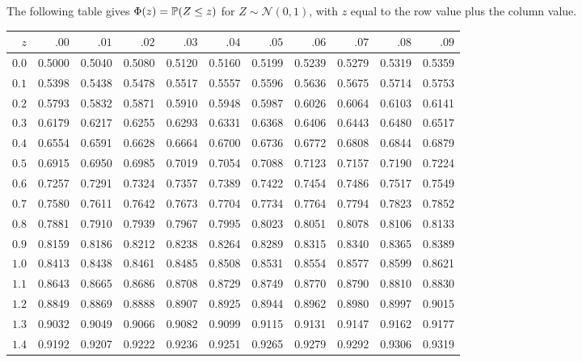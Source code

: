 \documentclass[11pt,oneside]{article}
\begin{document}
\noindent The following table gives $\Phi(z)=\mathbb{P}(Z\le z)$ for $Z\sim\mathcal N(0,1)$, with $z$ equal to the row value plus the column value.
\begin{center}
\begingroup\scriptsize
\setlength{\tabcolsep}{3pt}
\renewcommand{\arraystretch}{1.10}
\begin{tabular}{r*{10}{r}}
\toprule
$z$ & $.00$ & $.01$ & $.02$ & $.03$ & $.04$ & $.05$ & $.06$ & $.07$ & $.08$ & $.09$\\
\midrule
$0.0$ & 0.5000 & 0.5040 & 0.5080 & 0.5120 & 0.5160 & 0.5199 & 0.5239 & 0.5279 & 0.5319 & 0.5359\\
$0.1$ & 0.5398 & 0.5438 & 0.5478 & 0.5517 & 0.5557 & 0.5596 & 0.5636 & 0.5675 & 0.5714 & 0.5753\\
$0.2$ & 0.5793 & 0.5832 & 0.5871 & 0.5910 & 0.5948 & 0.5987 & 0.6026 & 0.6064 & 0.6103 & 0.6141\\
$0.3$ & 0.6179 & 0.6217 & 0.6255 & 0.6293 & 0.6331 & 0.6368 & 0.6406 & 0.6443 & 0.6480 & 0.6517\\
$0.4$ & 0.6554 & 0.6591 & 0.6628 & 0.6664 & 0.6700 & 0.6736 & 0.6772 & 0.6808 & 0.6844 & 0.6879\\
$0.5$ & 0.6915 & 0.6950 & 0.6985 & 0.7019 & 0.7054 & 0.7088 & 0.7123 & 0.7157 & 0.7190 & 0.7224\\
$0.6$ & 0.7257 & 0.7291 & 0.7324 & 0.7357 & 0.7389 & 0.7422 & 0.7454 & 0.7486 & 0.7517 & 0.7549\\
$0.7$ & 0.7580 & 0.7611 & 0.7642 & 0.7673 & 0.7704 & 0.7734 & 0.7764 & 0.7794 & 0.7823 & 0.7852\\
$0.8$ & 0.7881 & 0.7910 & 0.7939 & 0.7967 & 0.7995 & 0.8023 & 0.8051 & 0.8078 & 0.8106 & 0.8133\\
$0.9$ & 0.8159 & 0.8186 & 0.8212 & 0.8238 & 0.8264 & 0.8289 & 0.8315 & 0.8340 & 0.8365 & 0.8389\\
$1.0$ & 0.8413 & 0.8438 & 0.8461 & 0.8485 & 0.8508 & 0.8531 & 0.8554 & 0.8577 & 0.8599 & 0.8621\\
$1.1$ & 0.8643 & 0.8665 & 0.8686 & 0.8708 & 0.8729 & 0.8749 & 0.8770 & 0.8790 & 0.8810 & 0.8830\\
$1.2$ & 0.8849 & 0.8869 & 0.8888 & 0.8907 & 0.8925 & 0.8944 & 0.8962 & 0.8980 & 0.8997 & 0.9015\\
$1.3$ & 0.9032 & 0.9049 & 0.9066 & 0.9082 & 0.9099 & 0.9115 & 0.9131 & 0.9147 & 0.9162 & 0.9177\\
$1.4$ & 0.9192 & 0.9207 & 0.9222 & 0.9236 & 0.9251 & 0.9265 & 0.9279 & 0.9292 & 0.9306 & 0.9319\\
\bottomrule
\end{tabular}
\endgroup
\end{center}
\end{document}
